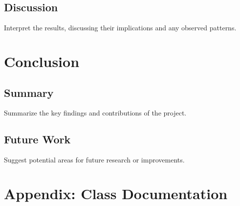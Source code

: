 \documentclass[11pt]{article}
\begin{document}
\subsection{Discussion}
Interpret the results, discussing their implications and any observed patterns.

\section{Conclusion}
\subsection{Summary}
Summarize the key findings and contributions of the project.

\subsection{Future Work}
Suggest potential areas for future research or improvements.

\newpage
\printbibliography

\appendix
\section{Appendix: Class Documentation}
\end{document}
